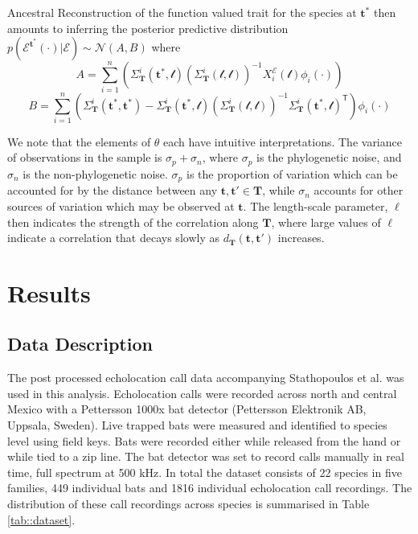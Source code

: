 \documentclass{ws-rv9x6}
\begin{document}
Ancestral Reconstruction of the function valued trait for the species at \(\mathbf{t}^*\) then amounts to inferring the posterior predictive distribution \(p(\mathcal{E}^{\mathbf{t}^*} (\cdot) | \mathcal{E}) \sim \mathcal{N}(A, B)\) where 
\begin{equation}
A = \sum_{i=1}^{n} \left( \Sigma_{\mathbf{T}}^i(\mathbf{t}^*, \mathcal{t}) \left( \Sigma_{\mathbf{T}}^i(\mathcal{t}, \mathcal{t})
\right)^{-1} X_i^{\mathcal{E}} (\mathcal{t}) \phi_i(\cdot) \right)
\label{eqn:postmean}
\end{equation}
\begin{equation}
B = \sum_{i=1}^{n}\left( \Sigma_{\mathbf{T}}^i(\mathbf{t}^*, \mathbf{t}^*) -  \Sigma_{\mathbf{T}}^i(\mathbf{t}^*, \mathcal{t}) \left( \Sigma_{\mathbf{T}}^i(\mathcal{t}, \mathcal{t})
\right)^{-1} \Sigma_{\mathbf{T}}^i(\mathbf{t}^*, \mathcal{t})^{\mathsf{T}} \right) \phi_i (\cdot)
\label{eqn:postvar}
\end{equation}

We note that the elements of \(\theta\) each have intuitive interpretations. The variance of observations in the sample is \(\sigma_p + \sigma_n\), where \(\sigma_p\) is the phylogenetic noise, and \(\sigma_n\) is the non-phylogenetic noise. \(\sigma_p\) is the proportion of variation which can be accounted for by the distance between any \(\mathbf{t}, \mathbf{t}' \in \mathbf{T}\), while \(\sigma_n\) accounts for other sources of variation which may be observed at \(\mathbf{t}\). The length-scale parameter, \(\ell\) then indicates the strength of the correlation along \(\mathbf{T}\), where large values of \(\ell\) indicate a correlation that decays slowly as \(d_{\mathbf{T}}(\mathbf{t}, \mathbf{t}')\) increases. 

\section{Results}

\subsection{Data Description}

The post processed echolocation call data accompanying Stathopoulos et al. \cite{stathopoulos2017bat} was used in this analysis. Echolocation calls were recorded across north and central Mexico with a Pettersson 1000x bat detector (Pettersson Elektronik AB, Uppsala, Sweden). Live trapped bats were measured and identified to species level using field keys.\cite{ceballos2005mamiferos} \cite{medellin2sanchez} Bats were recorded either while released from the hand or while tied to a zip line. The bat detector was set to record calls manually in real time, full spectrum at 500 kHz. 
In total the dataset consists of 22 species in five families, 449 individual bats and 1816 individual echolocation call recordings. The distribution of these call recordings across species is summarised in Table \ref{tab::dataset}.
\end{document}
